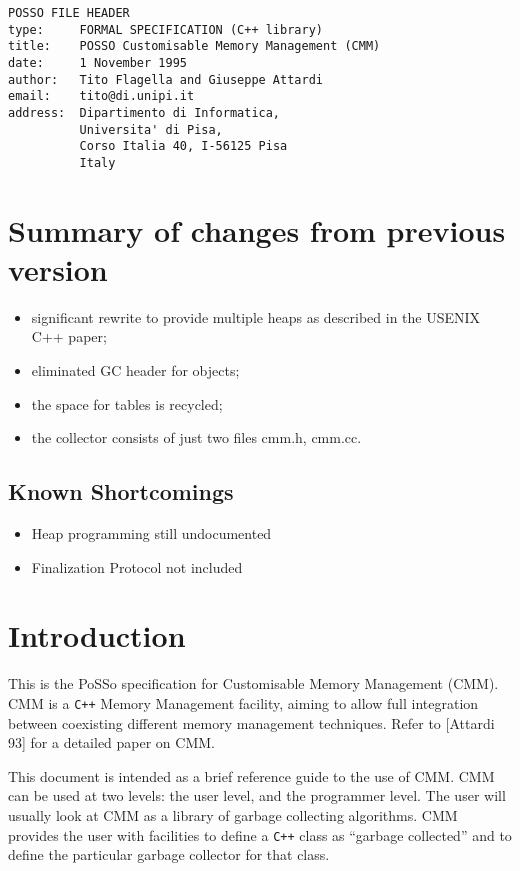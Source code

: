\def\theenumi{\alph{enumi}}
\def\labelenumi{(\alph{enumi})}
\pagestyle{myheadings}

\begin{verbatim}
POSSO FILE HEADER
type:     FORMAL SPECIFICATION (C++ library)
title:    POSSO Customisable Memory Management (CMM)
date:     1 November 1995
author:   Tito Flagella and Giuseppe Attardi
email:    tito@di.unipi.it
address:  Dipartimento di Informatica,
          Universita' di Pisa,
          Corso Italia 40, I-56125 Pisa
          Italy
\end{verbatim}

\section{Summary of changes from previous version}
\begin{itemize}
\item significant rewrite to provide multiple heaps as described in the
USENIX C++ paper;
\item eliminated GC header for objects;
\item the space for tables is recycled;
\item the collector consists of just two files cmm.h, cmm.cc.
\end{itemize}

\subsection {Known Shortcomings}
\begin{itemize}
\item Heap programming still undocumented
\item Finalization Protocol not included
\end{itemize}

\section{Introduction}

This is the PoSSo specification for Customisable Memory Management (CMM).  CMM
is a {\tt C++} Memory Management facility, aiming to allow full integration
between coexisting different memory management techniques.  Refer to [Attardi
93] for a detailed paper on CMM.

This document is intended as a brief reference guide to the use of CMM.  CMM
can be used at two levels: the user level, and the programmer level.  The user
will usually look at CMM as a library of garbage collecting algorithms.  CMM
provides the user with facilities to define a {\tt C++} class as ``garbage
collected'' and to define the particular garbage collector for that class.

